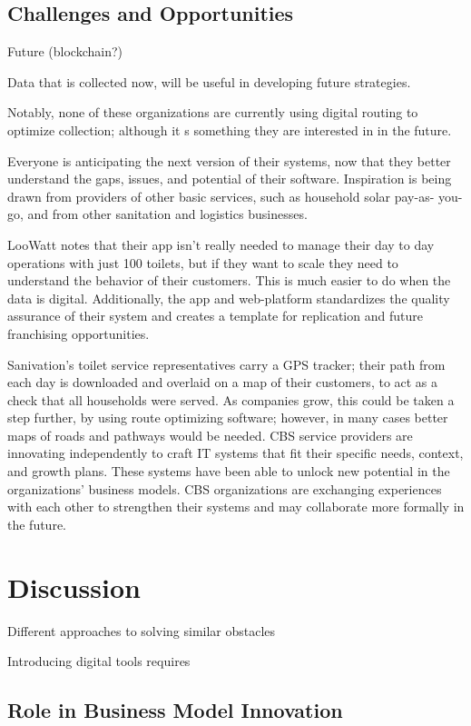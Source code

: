 \documentclass[sustainability,article,submit,moreauthors,pdftex,10pt,a4paper]{mdpi}
\theoremstyle{mdpi}
\newcounter{ex}
\newcounter{re}
\theoremstyle{mdpidefinition}
\begin{document}
\subsection{Challenges and Opportunities}
Future 
(blockchain?)

Data that is collected now, will be useful in developing future strategies. 

Notably, none of these organizations are currently using digital routing to optimize collection; although it s something they are interested in in the future. 

Everyone is anticipating the next version of their systems, now that they better understand the gaps, issues, and potential of their software.  Inspiration is being drawn from providers of other basic services, such as household solar pay-as- you-go, and from other sanitation and logistics businesses. %

LooWatt notes that their app isn’t really needed to manage their day to day operations with just 100 toilets, but if they want to scale they need to understand the behavior of their customers. This is much easier to do when the data is digital. Additionally, the app and web-platform standardizes the quality assurance of their system and creates a template for replication and future franchising opportunities. %

Sanivation’s toilet service representatives carry a GPS tracker; their path from each day is downloaded and overlaid on a map of their customers, to act as a check that all households were served. As companies grow, this could be taken a step further, by using route optimizing software; however, in many cases better maps of roads and pathways would be needed. 
CBS service providers are innovating independently to craft IT systems that fit their specific needs, context, and growth plans. These systems have been able to unlock new potential in the organizations’ business models. CBS organizations are exchanging experiences with each other to strengthen their systems and may collaborate more formally in the future. %


\section{Discussion}
Different approaches to solving similar obstacles 

Introducing digital tools requires 


\subsection{Role in Business Model Innovation}
\end{document}
